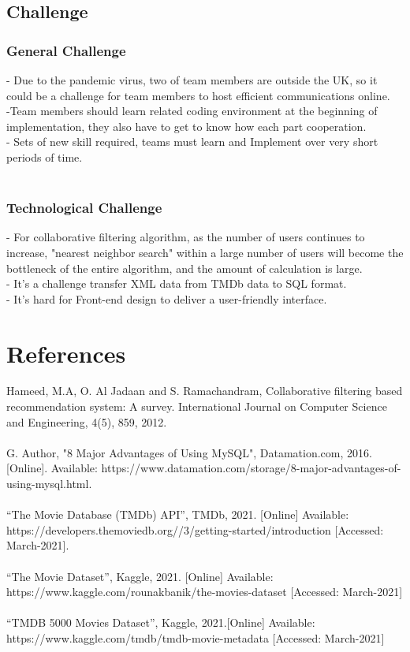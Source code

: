 \documentclass[12pt]{article}
\begin{document}
\subsection{Challenge}
\subsubsection{General Challenge} 
- Due to the pandemic virus, two of team members are outside the UK, so it could be a challenge for team members to host efficient communications online.\\
-Team members should learn related coding environment at the beginning of implementation, they also have to get to know how each part cooperation. \\
- Sets of new skill required, teams must learn and Implement over very short periods of time. \\
\\
\subsubsection{Technological Challenge} 
- For collaborative filtering algorithm,  as the number of users continues to increase, "nearest neighbor search" within a large number of users will become the bottleneck of the entire algorithm, and the amount of calculation is large.\\
-	It’s a challenge transfer XML data from TMDb data to  SQL format.\\
-	It’s hard for Front-end design to deliver a user-friendly interface.\\\newpage



\section {References}
\noindent [1] Hameed, M.A, O. Al Jadaan and S. Ramachandram, Collaborative filtering based recommendation system: A survey. International Journal on Computer Science and Engineering, 4(5), 859, 2012.\\
\\
\noindent [2] G. Author, "8 Major Advantages of Using MySQL", Datamation.com, 2016. [Online]. Available: https://www.datamation.com/storage/8-major-advantages-of-using-mysql.html. \\\\
\noindent [3] “The Movie Database (TMDb) API”, TMDb, 2021. [Online] Available:\\ https://developers.themoviedb.org//3/getting-started/introduction [Accessed: March-2021].\\\\
\noindent [4] “The Movie Dataset”, Kaggle, 2021. [Online] Available:\\ https://www.kaggle.com/rounakbanik/the-movies-dataset [Accessed: March-2021]\\\\
\noindent [5] “TMDB 5000 Movies Dataset”, Kaggle, 2021.[Online] Available:\\ https://www.kaggle.com/tmdb/tmdb-movie-metadata [Accessed: March-2021]\\
\end{document}
